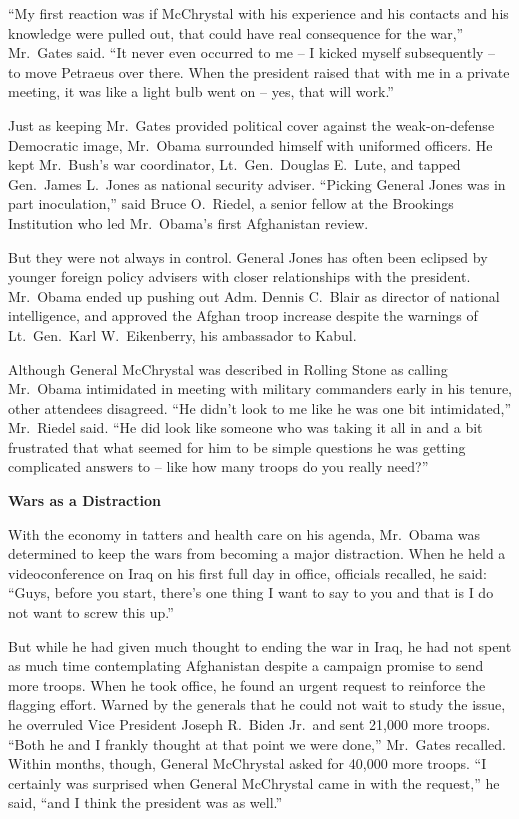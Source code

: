 ﻿\documentclass[12pt]{article}
\begin{document}
``My first reaction was if McChrystal with his experience and his contacts and his knowledge were
pulled out, that could have real consequence for the war,'' Mr.~Gates said. ``It never even occurred
to me -- I kicked myself subsequently -- to move Petraeus over there. When the president raised that
with me in a private meeting, it was like a light bulb went on -- yes, that will work.''

Just as keeping Mr.~Gates provided political cover against the weak-on-defense Democratic image,
Mr.~Obama surrounded himself with uniformed officers. He kept Mr.~Bush's war coordinator,
Lt.~Gen.~Douglas E.~Lute, and tapped Gen.~James L.~Jones as national security adviser. ``Picking
General Jones was in part inoculation,'' said Bruce O.~Riedel, a senior fellow at the Brookings
Institution who led Mr.~Obama's first Afghanistan review.

But they were not always in control. General Jones has often been eclipsed by younger foreign policy
advisers with closer relationships with the president. Mr.~Obama ended up pushing out Adm. Dennis
C.~Blair as director of national intelligence, and approved the Afghan troop increase despite the
warnings of Lt.~Gen.~Karl W.~Eikenberry, his ambassador to Kabul.

Although General McChrystal was described in Rolling Stone as calling Mr.~Obama intimidated in
meeting with military commanders early in his tenure, other attendees disagreed. ``He didn't look to
me like he was one bit intimidated,'' Mr.~Riedel said. ``He did look like someone who was taking it
all in and a bit frustrated that what seemed for him to be simple questions he was getting
complicated answers to -- like how many troops do you really need?''

\textbf{Wars as a Distraction}

With the economy in tatters and health care on his agenda, Mr.~Obama was determined to keep the wars
from becoming a major distraction. When he held a videoconference on Iraq on his first full day in
office, officials recalled, he said: ``Guys, before you start, there's one thing I want to say to
you and that is I do not want to screw this up.''

But while he had given much thought to ending the war in Iraq, he had not spent as much time
contemplating Afghanistan despite a campaign promise to send more troops. When he took office, he
found an urgent request to reinforce the flagging effort. Warned by the generals that he could not
wait to study the issue, he overruled Vice President Joseph R.~Biden Jr.~and sent 21,000 more
troops. ``Both he and I frankly thought at that point we were done,'' Mr.~Gates recalled. Within
months, though, General McChrystal asked for 40,000 more troops. ``I certainly was surprised when
General McChrystal came in with the request,'' he said, ``and I think the president was as well.''
\end{document}
